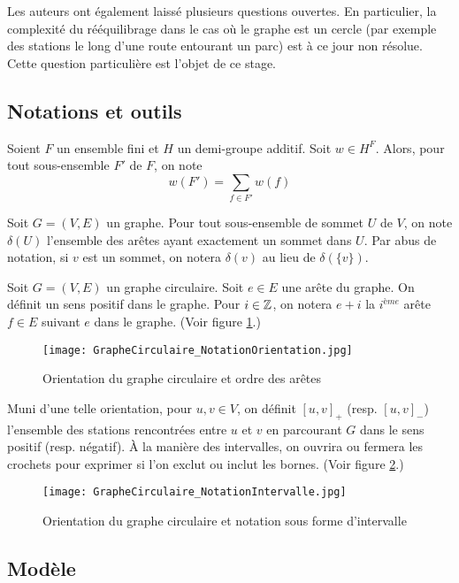 Les auteurs ont également laissé plusieurs questions ouvertes. En particulier, la complexité du rééquilibrage dans le cas où le graphe est un cercle (par exemple des stations le long d'une route entourant un parc) est à ce jour non résolue. Cette question particulière est l'objet de ce stage.

\subsection{Notations et outils}

Soient $F$ un ensemble fini et $H$ un demi-groupe additif. Soit $w \in H^F$. Alors, pour tout sous-ensemble $F'$ de $F$, on note $$w(F') = \sum_{f \in F'} w(f)$$

Soit $G=(V,E)$ un graphe. Pour tout sous-ensemble de sommet $U$ de $V$, on note $\delta(U)$ l'ensemble des arêtes ayant exactement un sommet dans $U$. Par abus de notation, si $v$ est un sommet, on notera $\delta(v)$ au lieu de $\delta(\{v\})$.

Soit $G=(V,E)$ un graphe circulaire. Soit $e \in E$ une arête du graphe. On définit un sens positif dans le graphe. Pour $i \in \mathbb{Z}$, on notera $e+i$ la $i^{ème}$ arête $f \in E$ suivant $e$ dans le graphe. (Voir figure \ref{Notation orientation graphe circulaire}.)
\begin{figure}[ht]
  \centering
  \texttt{[image: GrapheCirculaire\_NotationOrientation.jpg]}
  \caption{Orientation du graphe circulaire et ordre des arêtes}
  \label{Notation orientation graphe circulaire}
\end{figure}

Muni d'une telle orientation, pour $u,v \in V$, on définit $\left[ u,v \right]_+$ (resp. $\left[ u,v \right]_-$) l'ensemble des stations rencontrées entre $u$ et $v$ en parcourant $G$ dans le sens positif (resp. négatif). \`A la manière des intervalles, on ouvrira ou fermera les crochets pour exprimer si l'on exclut ou inclut les bornes. (Voir figure \ref{Notation intervalle graphe}.)
\begin{figure}[ht]
  \centering
  \texttt{[image: GrapheCirculaire\_NotationIntervalle.jpg]}
  \caption{Orientation du graphe circulaire et notation sous forme d'intervalle}
  \label{Notation intervalle graphe}
\end{figure}

\subsection{Modèle}


